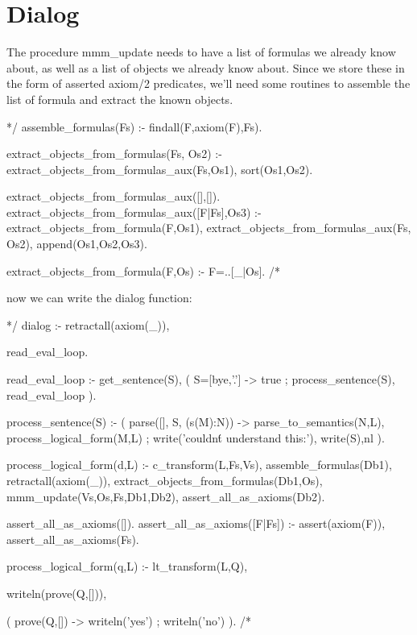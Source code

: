 \documentclass{book}[9pt]
\newenvironment{code}%
{\small \verbatim}%
{\endverbatim \large}
\begin{document}
\section{Dialog}

The procedure mmm\_update needs to have a list of formulas we already know
about, as well as a list of objects we already know about.  Since we store
these in the form of asserted axiom/2 predicates, we'll need some routines to
assemble the list of formula and extract the known objects.

\begin{code}
*/
assemble_formulas(Fs) :- findall(F,axiom(F),Fs).

extract_objects_from_formulas(Fs, Os2) :-
        extract_objects_from_formulas_aux(Fs,Os1),
        sort(Os1,Os2).

extract_objects_from_formulas_aux([],[]).
extract_objects_from_formulas_aux([F|Fs],Os3) :-
        extract_objects_from_formula(F,Os1),
        extract_objects_from_formulas_aux(Fs, Os2),
        append(Os1,Os2,Os3).

extract_objects_from_formula(F,Os) :- F=..[_|Os].
/*
\end{code}

\noindent now we can write the dialog function:

\begin{code}
*/
dialog :-
        retractall(axiom(_)),
        
        read_eval_loop.

read_eval_loop :-
        get_sentence(S),
        ( S=[bye,'.'] ->
            true
        ;
            process_sentence(S),
            read_eval_loop
        ).

process_sentence(S) :-
        (  parse([], S, (s(M):N)) ->
            parse_to_semantics(N,L),
            process_logical_form(M,L)
        ;
             write('couldn\'t understand this:'),
             write(S),nl
        ).

process_logical_form(d,L) :-
        c_transform(L,Fs,Vs),
        assemble_formulas(Db1),
        retractall(axiom(_)),
        extract_objects_from_formulas(Db1,Os),
        mmm_update(Vs,Os,Fs,Db1,Db2),
        assert_all_as_axioms(Db2).

assert_all_as_axioms([]).
assert_all_as_axioms([F|Fs]) :-
        assert(axiom(F)),
        assert_all_as_axioms(Fs).

process_logical_form(q,L) :-
        lt_transform(L,Q),
        
        writeln(prove(Q,[])),
        
        (  prove(Q,[]) ->
            writeln('yes')
        ; 
            writeln('no')
        ).
/*
\end{code}
\end{document}
